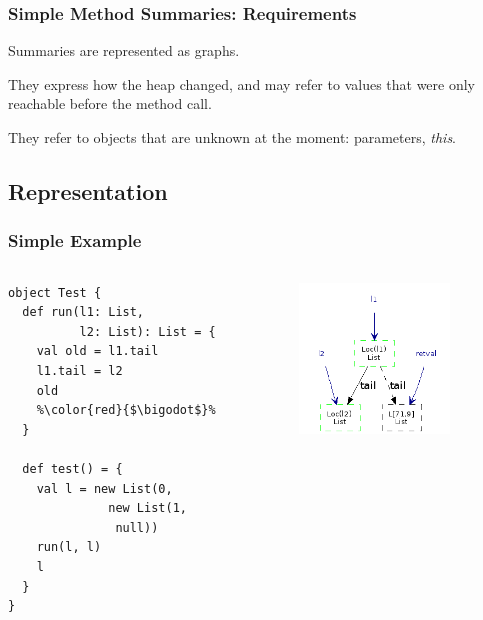 \documentclass[hyperref={pdfpagelabels=false}]{beamer}
\begin{document}
\begin{frame}
\frametitle{Simple Method Summaries: Requirements}
  Summaries are represented as graphs.

  \vspace{15pt}
  They express how the heap changed, and may refer to values that were
  only reachable before the method call.

  \vspace{15pt}
  They refer to objects that are unknown at the moment: parameters, \emph{this}.

\end{frame}
\subsection{Representation}

\begin{frame}[fragile]
\frametitle{Simple Example}
  \begin{columns}
    \begin{column}{0.4\textwidth}
\begin{lstlisting}
object Test {
  def run(l1: List,
          l2: List): List = {
    val old = l1.tail
    l1.tail = l2
    old
    %\color{red}{$\bigodot$}%
  }

  def test() = {
    val l = new List(0,
              new List(1,
               null))
    run(l, l)
    l
  }
}
\end{lstlisting}
    \end{column}
    \begin{column}{0.6\textwidth}
      \begin{figure}[t]
        \includegraphics[width=40mm]{images/run_sum.png}\\
      \end{figure}
    \end{column}
  \end{columns}
\end{frame}
\end{document}
